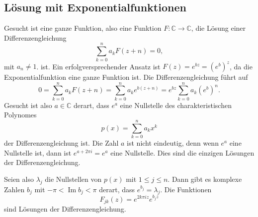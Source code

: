 \subsection{Lösung mit Exponentialfunktionen}
Gesucht ist eine ganze Funktion, also eine Funktion
$F\colon\mathbb{C}\to\mathbb{C}$, die Lösung einer
Differenzengleichung
\begin{equation}
\sum_{k=0}^n a_kF(z+n)=0,
\end{equation}
mit $a_n\ne 1$.
ist.
Ein erfolgversprechender Ansatz ist $F(z)=e^{bz}=(e^b)^z$, da die
Exponentialfunktion eine ganze Funktion ist.
Die Differenzengleichung führt auf
\[
0
=
\sum_{k=0}^n
a_kF(z+n)
=
\sum_{k=0}^n
a_k e^{b(z+n)}
=
e^{bz}
\sum_{k=0}^n
a_k (e^b)^n.
\]
Gesucht ist also $a\in\mathbb{C}$ derart, dass $e^a$ eine Nullstelle
des charakteristischen Polynomes
\[
p(x) = \sum_{k=0}^n a_kx^k
\]
der Differenzengleichung ist.
Die Zahl $a$ ist nicht eindeutig, denn wenn $e^a$ eine Nullstelle ist,
dann ist $e^{a+2\pi i}=e^a$ eine Nullstelle.
Dies sind die einzigen Lösungen der Differenzengleichung.

Seien also $\lambda_j$ die Nullstellen von $p(x)$ mit $1\le j\le n$.
Dann gibt es komplexe Zahlen $b_j$ 
mit $-\pi < \operatorname{Im}b_j < \pi$ derart, dass $e^{b_j}=\lambda_j$.
Die Funktionen
\[
F_{jk}(z) = e^{2k\pi i z} e^{b_jz}
\]
sind Lösungen der Differenzengleichung.

